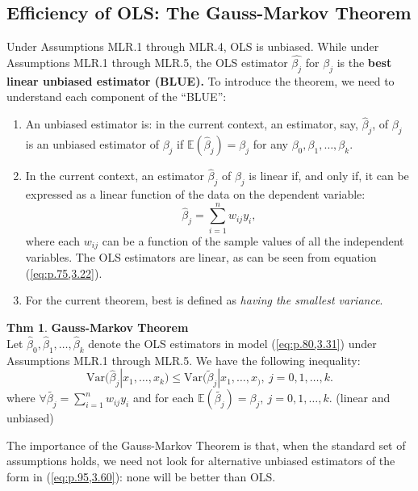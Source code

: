 \documentclass[a4paper, 10pt]{article}
\theoremstyle{definition}	%
\newtheorem{theorem}{Thm}
\begin{document}
\subsection{Efficiency of OLS: The Gauss-Markov Theorem}
Under Assumptions MLR.1 through MLR.4, OLS is unbiased. While under Assumptions MLR.1 through MLR.5, the OLS estimator $\hat{\beta_j}$ for $\beta_j$ is the \textbf{best linear unbiased estimator (BLUE).} To introduce the theorem, we need to understand each component of the ``BLUE'':
\begin{enumerate}
    \item An unbiased estimator is: in the current context, an estimator, say, $\hat{\beta}_j$, of $\beta_j$ is an unbiased estimator of $\beta_j$ if $\mathbb{E}(\hat{\beta}_j) = \beta_j$ for any $\beta_0, \beta_1, \dots, \beta_k$.
    \item In the current context, an estimator $\hat{\beta}_j$ of $\beta_j$ is linear if, and only if, it can be expressed as a linear function of the data on the dependent variable:
    \begin{equation}
        \hat{\beta}_j = \sum_{i=1}^n w_{ij} y_i, \label{eq:p.95,3.60}
    \end{equation}
    where each $w_{ij}$ can be a function of the sample values of all the independent variables. The OLS estimators are linear, as can be seen from equation (\ref{eq:p.75,3.22}).
    \item For the current theorem, best is defined as \textit{having the smallest variance}.
\end{enumerate}
\begin{theorem}
    \textbf{Gauss-Markov Theorem}\\
    Let $\hat{\beta}_0, \hat{\beta}_1, \dots, \hat{\beta}_k$ denote the OLS estimators in model (\ref{eq:p.80,3.31}) under Assumptions MLR.1 through MLR.5. We have the following inequality:
    \begin{equation}
        \text{Var}(\hat{\beta}_j|x_1,\ldots, x_k) \leq \text{Var}(\tilde{\beta}_j|x_1,\ldots, x_),\ j = 0, 1, \ldots, k. 
    \end{equation}
    where $\forall \tilde{\beta_j} = \sum_{i=1}^n w_{ij}y_i$ and for each $\mathbb{E}(\tilde{\beta_j}) = \beta_j,\ j= 0, 1, \ldots, k$. (linear and unbiased)
\end{theorem}
The importance of the Gauss-Markov Theorem is that, when the standard set of assumptions
holds, we need not look for alternative unbiased estimators of the form in (\ref{eq:p.95,3.60}): none will be better than OLS.
\end{document}
